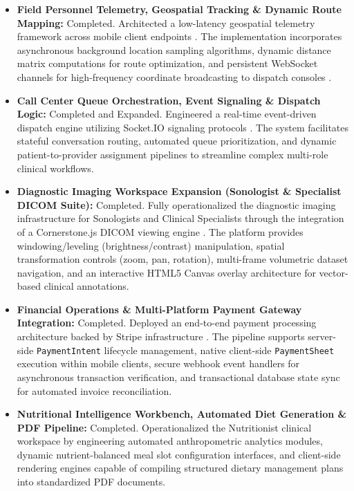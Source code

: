 \documentclass[onecolumn,journal]{IEEEtran}
\begin{document}
	\begin{itemize}
		\item \textbf{Field Personnel Telemetry, Geospatial Tracking \& Dynamic Route Mapping:} Completed. Architected a low-latency geospatial telemetry framework across mobile client endpoints \cite{zandbergen2009accuracy}. The implementation incorporates asynchronous background location sampling algorithms, dynamic distance matrix computations for route optimization, and persistent WebSocket channels for high-frequency coordinate broadcasting to dispatch consoles \cite{fette2011websocket}.
		
		\item \textbf{Call Center Queue Orchestration, Event Signaling \& Dispatch Logic:} Completed and Expanded. Engineered a real-time event-driven dispatch engine utilizing Socket.IO signaling protocols \cite{fette2011websocket}. The system facilitates stateful conversation routing, automated queue prioritization, and dynamic patient-to-provider assignment pipelines to streamline complex multi-role clinical workflows.
		
		\item \textbf{Diagnostic Imaging Workspace Expansion (Sonologist \& Specialist DICOM Suite):} Completed. Fully operationalized the diagnostic imaging infrastructure for Sonologists and Clinical Specialists through the integration of a Cornerstone.js DICOM viewing engine \cite{dicom2021, pacs2001}. The platform provides windowing/leveling (brightness/contrast) manipulation, spatial transformation controls (zoom, pan, rotation), multi-frame volumetric dataset navigation, and an interactive HTML5 Canvas overlay architecture for vector-based clinical annotations.
		
		\item \textbf{Financial Operations \& Multi-Platform Payment Gateway Integration:} Completed. Deployed an end-to-end payment processing architecture backed by Stripe infrastructure \cite{stripe2024api}. The pipeline supports server-side \texttt{PaymentIntent} lifecycle management, native client-side \texttt{PaymentSheet} execution within mobile clients, secure webhook event handlers for asynchronous transaction verification, and transactional database state sync for automated invoice reconciliation.
		
		\item \textbf{Nutritional Intelligence Workbench, Automated Diet Generation \& PDF Pipeline:} Completed. Operationalized the Nutritionist clinical workspace by engineering automated anthropometric analytics modules, dynamic nutrient-balanced meal slot configuration interfaces, and client-side rendering engines capable of compiling structured dietary management plans into standardized PDF documents.
	\end{itemize}
	
\end{document}
